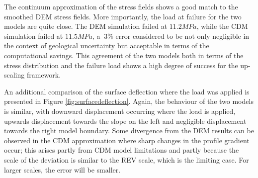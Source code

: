 The continuum approximation of the stress fields shows a good match to the smoothed DEM stress fields. More importantly, the load at failure for the two models are quite close. The DEM simulation failed at $11.2 MPa$, while the CDM simulation failed at $11.5 MPa$, a $~3\%$ error considered to be not only negligible in the context of geological uncertainty but acceptable in terms of the computational savings. This agreement of the two models both in terms of the stress distribution and the failure load shows a high degree of success for the up-scaling framework. 

An additional comparison of the surface deflection where the load was applied is presented in Figure \ref{fig:surfacedeflection}. Again, the behaviour of the two models is similar, with downward displacement occurring where the load is applied, upwards displacement towards the slope on the left and negligible displacement towards the right model boundary. Some divergence from  the DEM results can be observed in the CDM approximation where sharp changes in the profile gradient occur; this arises partly from CDM model limitations and partly because the scale of the deviation is similar to the REV scale, which is the limiting case. For larger scales, the error will be smaller.